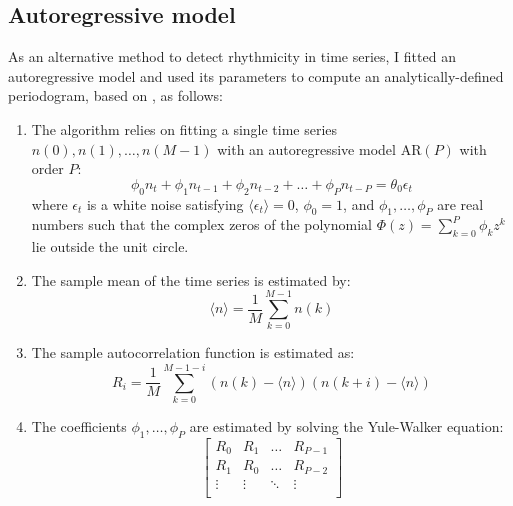 \subsection{Autoregressive model}
\label{subsec:methods-computational-ar}

As an alternative method to detect rhythmicity in time series, I fitted an autoregressive model and used its parameters to compute an analytically-defined periodogram, based on \textcite{jiaFrequencyDomainAnalysis2020}, as follows:

\begin{enumerate}
  \item The algorithm relies on fitting a single time series $n(0), n(1), \ldots , n(M-1)$ with an autoregressive model $\mathrm{AR}(P)$ with order $P$:
        \begin{equation}
          \label{eq:ar-model}
          \phi_{0}n_{t} + \phi_{1}n_{t-1} + \phi_{2}n_{t-2} + \ldots + \phi_{P}n_{t-P} = \theta_{0}\epsilon_{t}
        \end{equation}
        where $\epsilon_{t}$ is a white noise satisfying $\langle \epsilon_{t} \rangle = 0$,
        $\phi_{0} = 1$, and
        $\phi_{1}, \ldots , \phi_{P}$ are real numbers such that the complex zeros of the polynomial $\Phi (z) = \sum_{k=0}^{P} \phi_{k}z^{k}$ lie outside the unit circle.
  \item The sample mean of the time series is estimated by:
        \begin{equation}
          \label{eq:ar-mean}
          \langle n \rangle = \frac{1}{M} \sum_{k=0}^{M-1}n(k)
        \end{equation}
  \item The sample autocorrelation function is estimated as:
        \begin{equation}
          \label{eq:ar-acf}
          R_{i} = \frac{1}{M} \sum_{k=0}^{M-1-i}(n(k) - \langle n \rangle)(n(k+i) - \langle n \rangle)
        \end{equation}
  \item The coefficients $\phi_{1}, \ldots , \phi_{P}$ are estimated by solving the Yule-Walker equation:
        \begin{equation}
          \label{eq:ar-yule-walker}
          \begin{bmatrix}
            R_{0} & R_{1} & \dots & R_{P-1} \\
            R_{1} & R_{0} & \dots & R_{P-2} \\
            \vdots & \vdots & \ddots & \vdots \\

\end{bmatrix}
\end{equation}
\end{enumerate}
